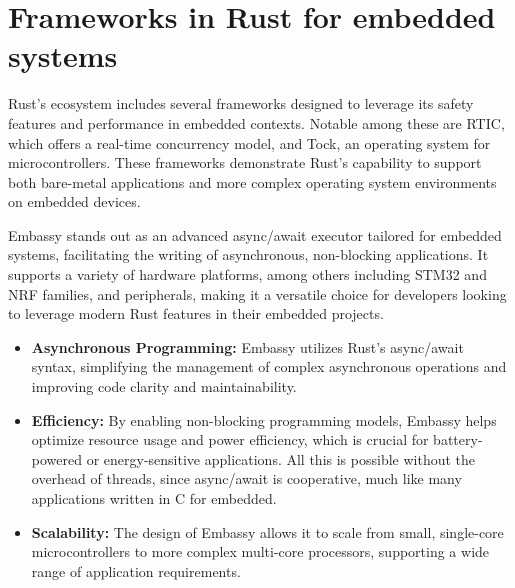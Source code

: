 \section{Frameworks in Rust for embedded systems}
Rust's ecosystem includes several frameworks designed to leverage its safety features and performance in embedded contexts. Notable among these are RTIC, which offers a real-time concurrency model, and Tock, an operating system for microcontrollers. These frameworks demonstrate Rust's capability to support both bare-metal applications and more complex operating system environments on embedded devices.

Embassy stands out as an advanced async/await executor tailored for embedded systems, facilitating the writing of asynchronous, non-blocking applications. It supports a variety of hardware platforms, among others including STM32 and NRF families, and peripherals, making it a versatile choice for developers looking to leverage modern Rust features in their embedded projects.

\begin{itemize}
    \item \textbf{Asynchronous Programming:} Embassy utilizes Rust's async/await syntax, simplifying the management of complex asynchronous operations and improving code clarity and maintainability.
    \item \textbf{Efficiency:} By enabling non-blocking programming models, Embassy helps optimize resource usage and power efficiency, which is crucial for battery-powered or energy-sensitive applications. All this is possible without the overhead of threads, since async/await is cooperative, much like many applications written in C for embedded.
    \item \textbf{Scalability:} The design of Embassy allows it to scale from small, single-core microcontrollers to more complex multi-core processors, supporting a wide range of application requirements.
\end{itemize}


